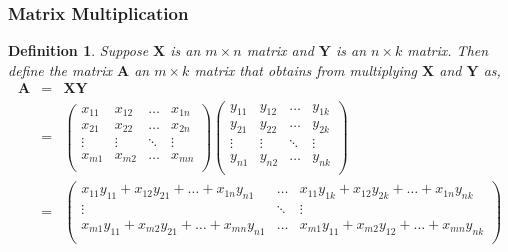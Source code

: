 \documentclass{beamer}
\newtheorem{defn}{Definition}
\numberwithin{equation}{section}
\begin{document}
\begin{frame}
\frametitle{Matrix Multiplication}

\begin{defn} Suppose $\boldsymbol{X}$ is an $m \times n$ matrix and $\boldsymbol{Y}$ is an $n \times k$ matrix.  Then define the matrix $\boldsymbol{A}$ an $m \times k$ matrix that obtains from \alert{multiplying} $\boldsymbol{X}$ and $\boldsymbol{Y}$ as, 
\small
\begin{eqnarray}
\boldsymbol{A} & = & \boldsymbol{X} \boldsymbol{Y} \nonumber \\
						& = & \begin{pmatrix} 
								x_{11} & x_{12} & \hdots & x_{1n} \\
								x_{21} & x_{22} & \hdots & x_{2n} \\
								\vdots & \vdots & \ddots & \vdots \\
								x_{m1} & x_{m2} & \hdots & x_{mn} \\
								\end{pmatrix} 
								\begin{pmatrix} 
								y_{11} & y_{12} & \hdots & y_{1k} \\
								y_{21} & y_{22} & \hdots & y_{2k} \\
								\vdots & \vdots & \ddots & \vdots \\
								y_{n1} & y_{n2} & \hdots & y_{nk} \\
								\end{pmatrix} \nonumber \\
						& = & \begin{pmatrix}
						x_{11} y_{11} + x_{12} y_{21} + \hdots +  x_{1n} y_{n1} & \hdots & x_{11} y_{1k} + x_{12} y_{2k} + \hdots+  x_{1n} y_{nk} \\
						\vdots  & \ddots & \vdots \\
						x_{m1} y_{11} + x_{m2} y_{21} + \hdots + x_{mn} y_{n1} & \hdots & x_{m1} y_{11} + x_{m2} y_{12} + \hdots + 	x_{mn} y_{nk} \\
						\end{pmatrix} 	\nonumber 													
								\end{eqnarray}
\end{defn}								

\end{frame}
\end{document}
